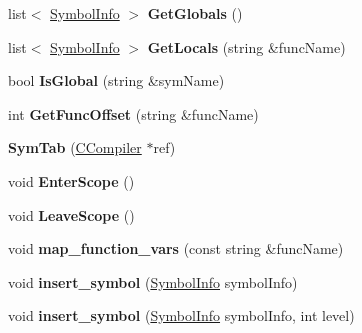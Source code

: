 \begin{DoxyCompactItemize}
\item 
\hypertarget{classSymTab_aced837e720830dd9ccb2d3dde621d489}{list$<$ \hyperlink{structSymbolInfo}{Symbol\-Info} $>$ {\bfseries Get\-Globals} ()}\label{classSymTab_aced837e720830dd9ccb2d3dde621d489}

\item 
\hypertarget{classSymTab_a76b5a70170535019b1fe58fa25a9998c}{list$<$ \hyperlink{structSymbolInfo}{Symbol\-Info} $>$ {\bfseries Get\-Locals} (string \&func\-Name)}\label{classSymTab_a76b5a70170535019b1fe58fa25a9998c}

\item 
\hypertarget{classSymTab_a4c4699d90ffd605b205e9e94be9eacde}{bool {\bfseries Is\-Global} (string \&sym\-Name)}\label{classSymTab_a4c4699d90ffd605b205e9e94be9eacde}

\item 
\hypertarget{classSymTab_a793c31d247f484b04a9283e71f172756}{int {\bfseries Get\-Func\-Offset} (string \&func\-Name)}\label{classSymTab_a793c31d247f484b04a9283e71f172756}

\item 
\hypertarget{classSymTab_a20c7b65c7ffb728fa792e87258d381a2}{{\bfseries Sym\-Tab} (\hyperlink{classCCompiler}{C\-Compiler} $\ast$ref)}\label{classSymTab_a20c7b65c7ffb728fa792e87258d381a2}

\item 
\hypertarget{classSymTab_af335dd1ba840dfab4219856545d5d8ef}{void {\bfseries Enter\-Scope} ()}\label{classSymTab_af335dd1ba840dfab4219856545d5d8ef}

\item 
\hypertarget{classSymTab_afd2c44208cdad3ddfc85136136cd27c3}{void {\bfseries Leave\-Scope} ()}\label{classSymTab_afd2c44208cdad3ddfc85136136cd27c3}

\item 
\hypertarget{classSymTab_aaca51de0935bbdbf3fdf434deccccb92}{void {\bfseries map\-\_\-function\-\_\-vars} (const string \&func\-Name)}\label{classSymTab_aaca51de0935bbdbf3fdf434deccccb92}

\item 
\hypertarget{classSymTab_ad8e59e29c50f039570c5844871bf838c}{void {\bfseries insert\-\_\-symbol} (\hyperlink{structSymbolInfo}{Symbol\-Info} symbol\-Info)}\label{classSymTab_ad8e59e29c50f039570c5844871bf838c}

\item 
\hypertarget{classSymTab_a8372047f573c6d84fa231aa7e9842280}{void {\bfseries insert\-\_\-symbol} (\hyperlink{structSymbolInfo}{Symbol\-Info} symbol\-Info, int level)}\label{classSymTab_a8372047f573c6d84fa231aa7e9842280}


\end{DoxyCompactItemize}
